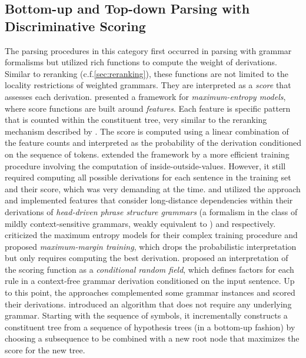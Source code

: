 \documentclass[../document.tex]{subfiles}
\begin{document}
    \subsection{Bottom-up and Top-down Parsing with Discriminative Scoring}\label{sec:literature:chart}
    The parsing procedures in this category first occurred in parsing with grammar formalisms but utilized rich functions to compute the weight of derivations.
    Similar to reranking (c.f.\@ \cref{sec:reranking}), these functions are not limited to the locality restrictions of weighted grammars.
    They are interpreted as a \emph{score} that assesses each derivation.
     presented a framework for \emph{maximum-entropy models}, where score functions are built around \emph{features}.
    Each feature is specific pattern that is counted within the constituent tree, very similar to the reranking mechanism described by \citet{collins2001convolution}.
    The score is computed using a linear combination of the feature counts and interpreted as the probability of the derivation conditioned on the sequence of tokens.
     extended the framework by a more efficient training procedure involving the computation of inside-outside-values.
    However, it still required computing all possible derivations for each sentence in the training set and their score, which was very demanding at the time.
     and \citet{Clark04a} utilized the approach and implemented features that consider long-distance dependencies within their derivations of \emph{head-driven phrase structure grammars} (a formalism in the class of mildly context-sensitive grammars, weakly equivalent to ) and  respectively.
     criticized the maximum entropy models for their complex training procedure and proposed \emph{maximum-margin training}, which drops the probabilistic interpretation but only requires computing the best derivation.
     proposed an interpretation of the scoring function as a \emph{conditional random field}, which defines factors for each rule in a context-free grammar derivation conditioned on the input sentence.
    Up to this point, the approaches complemented some grammar instances and scored their derivations.
     introduced an algorithm that does not require any underlying grammar.
    Starting with the sequence of  symbols, it incrementally constructs a constituent tree from a sequence of hypothesis trees (in a bottom-up fashion) by choosing a subsequence to be combined with a new root node that maximizes the score for the new tree.
\end{document}
